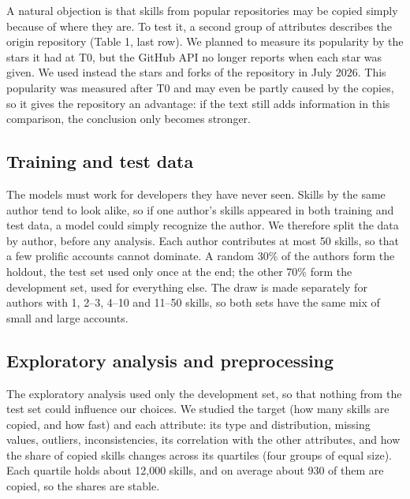 A natural objection is that skills from popular repositories may be
copied simply because of where they are. To test it, a second group of
attributes describes the origin repository (Table 1, last row). We
planned to measure its popularity by the stars it had at T0, but the
GitHub API no longer reports when each star was given. We used instead
the stars and forks of the repository in July 2026. This popularity was
measured after T0 and may even be partly caused by the copies, so it
gives the repository an advantage: if the text still adds information in
this comparison, the conclusion only becomes stronger.

\subsection{Training and test data}\label{training-and-test-data}

The models must work for developers they have never seen. Skills by the
same author tend to look alike, so if one author's skills appeared in
both training and test data, a model could simply recognize the author.
We therefore split the data by author, before any analysis. Each author
contributes at most 50 skills, so that a few prolific accounts cannot
dominate. A random 30\% of the authors form the holdout, the test set
used only once at the end; the other 70\% form the development set, used
for everything else. The draw is made separately for authors with 1,
2--3, 4--10 and 11--50 skills, so both sets have the same mix of small
and large accounts.

\subsection{Exploratory analysis and
preprocessing}\label{exploratory-analysis-and-preprocessing}

The exploratory analysis used only the development set, so that nothing
from the test set could influence our choices. We studied the target
(how many skills are copied, and how fast) and each attribute: its type
and distribution, missing values, outliers, inconsistencies, its
correlation with the other attributes, and how the share of copied
skills changes across its quartiles (four groups of equal size). Each
quartile holds about 12,000 skills, and on average about 930 of them are
copied, so the shares are stable.


